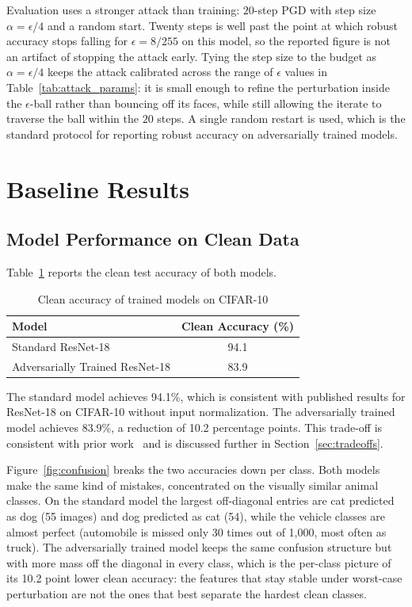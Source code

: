 Evaluation uses a stronger attack than training: $20$-step PGD with step size $\alpha = \epsilon/4$ and a random start. Twenty steps is well past the point at which robust accuracy stops falling for $\epsilon = 8/255$ on this model, so the reported figure is not an artifact of stopping the attack early. Tying the step size to the budget as $\alpha = \epsilon/4$ keeps the attack calibrated across the range of $\epsilon$ values in Table~\ref{tab:attack_params}: it is small enough to refine the perturbation inside the $\epsilon$-ball rather than bouncing off its faces, while still allowing the iterate to traverse the ball within the $20$ steps. A single random restart is used, which is the standard protocol for reporting robust accuracy on adversarially trained models.

\section{Baseline Results}

\subsection{Model Performance on Clean Data}

Table~\ref{tab:clean_accuracy} reports the clean test accuracy of both models.

\begin{table}[htbp]
    \centering
    \caption{Clean accuracy of trained models on CIFAR-10}
    \label{tab:clean_accuracy}
    \begin{tabular}{lc}
        \toprule
        \textbf{Model} & \textbf{Clean Accuracy (\%)} \\
        \midrule
        Standard ResNet-18 & 94.1 \\
        Adversarially Trained ResNet-18 & 83.9 \\
        \bottomrule
    \end{tabular}
\end{table}

The standard model achieves 94.1\%, which is consistent with published results for ResNet-18 on CIFAR-10 without input normalization. The adversarially trained model achieves 83.9\%, a reduction of 10.2 percentage points. This trade-off is consistent with prior work~\cite{madry2018towards} and is discussed further in Section~\ref{sec:tradeoffs}.

Figure~\ref{fig:confusion} breaks the two accuracies down per class. Both models make the same kind of mistakes, concentrated on the visually similar animal classes. On the standard model the largest off-diagonal entries are cat predicted as dog (55 images) and dog predicted as cat (54), while the vehicle classes are almost perfect (automobile is missed only 30 times out of 1{,}000, most often as truck). The adversarially trained model keeps the same confusion structure but with more mass off the diagonal in every class, which is the per-class picture of its 10.2 point lower clean accuracy: the features that stay stable under worst-case perturbation are not the ones that best separate the hardest clean classes.

